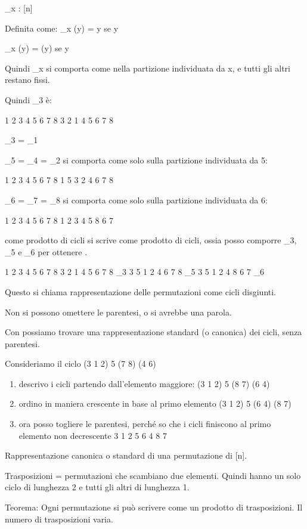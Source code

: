 \mu_x : [n] \to [n]

Definita come:
\mu_x (y) = y se y \notin [x]

\mu_x (y) = \sigma(y) se y \in [x]

Quindi \mu_x si comporta come \mu nella partizione individuata da x, e tutti gli altri restano fissi.

Quindi \mu_3 \`e:

1 2 3 4 5 6 7 8
3 2 1 4 5 6 7 8

\mu_3 = \mu_1

\mu_5 = \mu_4 = \mu_2 si comporta come \mu solo sulla partizione individuata da 5:

1 2 3 4 5 6 7 8
1 5 3 2 4 6 7 8

\mu_6 = \mu_7 = \mu_8 si comporta come \mu solo sulla partizione individuata da 6:

1 2 3 4 5 6 7 8
1 2 3 4 5 8 6 7

\mu come prodotto di cicli si scrive come prodotto di cicli, ossia posso comporre \mu_3, \mu_5 e \mu_6 per ottenere \mu.

1 2 3 4 5 6 7 8
3 2 1 4 5 6 7 8 \mu_3
3 5 1 2 4 6 7 8 \mu_5
3 5 1 2 4 8 6 7 \mu_6

Questo si chiama rappresentazione delle permutazioni come cicli disgiunti.

Non si possono omettere le parentesi, o si avrebbe una parola.

Con  possiamo trovare una rappresentazione standard (o canonica) dei cicli, senza parentesi.

Consideriamo il ciclo (3 1 2) 5 (7 8) (4 6)

\begin{enumerate}
    \item descrivo i cicli partendo dall'elemento maggiore:
    (3 1 2) 5 (8 7) (6 4)
    \item ordino in maniera crescente in base al primo elemento
    (3 1 2) 5 (6 4) (8 7)
    \item ora posso togliere le parentesi, perch\'e so che i cicli finiscono al primo elemento non decrescente
    3 1 2 5 6 4 8 7
\end{enumerate}

Rappresentazione canonica o standard di una permutazione di [n].

Trasposizioni = permutazioni che scambiano due elementi. Quindi hanno un solo ciclo di lunghezza 2 e tutti gli altri di lunghezza 1.

Teorema:
Ogni permutazione si pu\`o scrivere come un prodotto di trasposizioni. Il numero di trasposizioni varia.

